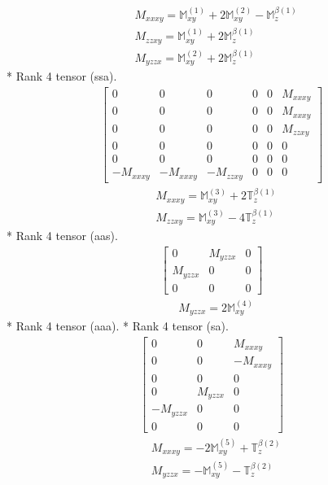 \documentclass[fleqn,8pt,landscape]{jsarticle}
\begin{document}
\begin{align*}
& M_{xxxy} = \mathbb{M}_{xy}^{(1)} + 2 \mathbb{M}_{xy}^{(2)} - \mathbb{M}_{z}^{\beta(1)} \\
& M_{zzxy} = \mathbb{M}_{xy}^{(1)} + 2 \mathbb{M}_{z}^{\beta(1)} \\
& M_{yzzx} = \mathbb{M}_{xy}^{(2)} + 2 \mathbb{M}_{z}^{\beta(1)}
\end{align*}
* Rank 4 tensor (ssa).
\begin{align*}
\begin{bmatrix} 0 & 0 & 0 & 0 & 0 & M_{xxxy} \\ 0 & 0 & 0 & 0 & 0 & M_{xxxy} \\ 0 & 0 & 0 & 0 & 0 & M_{zzxy} \\ 0 & 0 & 0 & 0 & 0 & 0 \\ 0 & 0 & 0 & 0 & 0 & 0 \\ - M_{xxxy} & - M_{xxxy} & - M_{zzxy} & 0 & 0 & 0 \end{bmatrix}
\end{align*}
\begin{align*}
& M_{xxxy} = \mathbb{M}_{xy}^{(3)} + 2 \mathbb{T}_{z}^{\beta(1)} \\
& M_{zzxy} = \mathbb{M}_{xy}^{(3)} - 4 \mathbb{T}_{z}^{\beta(1)}
\end{align*}
* Rank 4 tensor (aas).
\begin{align*}
\begin{bmatrix} 0 & M_{yzzx} & 0 \\ M_{yzzx} & 0 & 0 \\ 0 & 0 & 0 \end{bmatrix}
\end{align*}
\begin{align*}
& M_{yzzx} = 2 \mathbb{M}_{xy}^{(4)}
\end{align*}
* Rank 4 tensor (aaa).
* Rank 4 tensor (sa).
\begin{align*}
\begin{bmatrix} 0 & 0 & M_{xxxy} \\ 0 & 0 & - M_{xxxy} \\ 0 & 0 & 0 \\ 0 & M_{yzzx} & 0 \\ - M_{yzzx} & 0 & 0 \\ 0 & 0 & 0 \end{bmatrix}
\end{align*}
\begin{align*}
& M_{xxxy} = - 2 \mathbb{M}_{xy}^{(5)} + \mathbb{T}_{z}^{\beta(2)} \\
& M_{yzzx} = - \mathbb{M}_{xy}^{(5)} - \mathbb{T}_{z}^{\beta(2)}
\end{align*}
\end{document}
